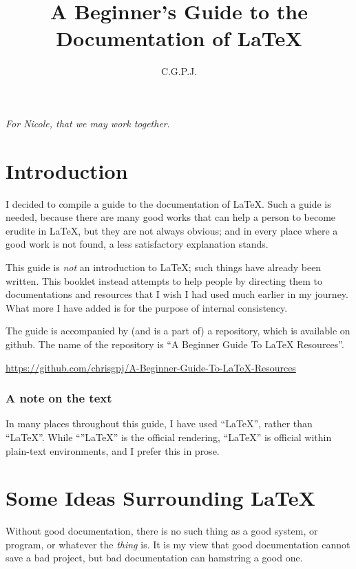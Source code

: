\documentclass[11pt, oneside]{memoir}
\title{A Beginner's Guide to the Documentation of \LaTeX{}}
\author{C.\thinspace G.\thinspace P.\thinspace J.\thinspace}
\begin{document}
\maketitle
\thispagestyle{empty}

\RaggedRight
\newpage
\thispagestyle{empty}
\emph{For Nicole, that we may work together}.

\newpage
\tableofcontents

\chapter{Introduction}
I decided to compile a guide to the documentation of \LaTeX{}. Such a guide is needed, because there are many good works that can help a person to become erudite in \LaTeX{}, but they are not always obvious; and in every place where a good work is not found, a less satisfactory explanation stands.

This guide is \emph{not} an introduction to LaTeX; such things have already been written. This booklet instead attempts to help people by directing them to documentations and resources that I wish I had used much earlier in my journey. What more I have added is for the purpose of internal consistency.

The guide is accompanied by (and is a part of) a repository, which is available on github. The name of the repository is ``A Beginner Guide To LaTeX Resources''.

\url{https://github.com/chrisgpj/A-Beginner-Guide-To-LaTeX-Resources}

\subsection{A note on the text}
In many places throughout this guide, I have used ``LaTeX'', rather than ``\LaTeX{}''. While ``''\LaTeX{}'' is the official rendering, ``LaTeX'' is official within plain-text environments, and I prefer this in prose.

\chapter{Some Ideas Surrounding \LaTeX{}}
Without good documentation, there is no such thing as a good system, or program, or whatever the \emph{thing} is. It is my view that good documentation cannot save a bad project, but bad documentation can hamstring a good one.
\end{document}
